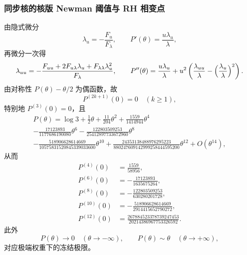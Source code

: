 \subsubsection{同步核的核版 Newman 阈值与 RH 相变点}\label{app:sync-kernel-weighted-newman-threshold}


由隐式微分
\[
\lambda_u=-\frac{F_u}{F_\lambda},\qquad
P'(\theta)=\frac{u\lambda_u}{\lambda},
\]
再微分一次得
\[
\lambda_{uu}=-\frac{F_{uu}+2F_{u\lambda}\lambda_u+F_{\lambda\lambda}\lambda_u^2}{F_\lambda},
\qquad
P''(\theta)=\frac{u\lambda_u}{\lambda}+u^2\left(\frac{\lambda_{uu}}{\lambda}-\Bigl(\frac{\lambda_u}{\lambda}\Bigr)^2\right).
\]
由对称性 $P(\theta)-\theta/2$ 为偶函数，故
\[
P^{(2k+1)}(0)=0\quad(k\ge 1),
\]
特别地 $P^{(3)}(0)=0$，且
\[
\begin{aligned}
P(\theta)=\log 3+\frac12\theta+\frac{11}{204}\theta^2+\frac{1559}{1414944}\theta^4\\
-\frac{17123893}{1177686190080}\theta^6-\frac{122803509253}{25412897733672960}\theta^8\\
-\frac{518906628614669}{10575831520845339033600}\theta^{10}
+\frac{24353138488976295223}{880247609142999258444595200}\theta^{12}
+O(\theta^{14}),
\end{aligned}
\]
从而
\[
\begin{aligned}
P^{(4)}(0)&=\frac{1559}{58956},\\
P^{(6)}(0)&=-\frac{17123893}{1635675264},\\
P^{(8)}(0)&=-\frac{122803509253}{630280201728},\\
P^{(10)}(0)&=-\frac{518906628614669}{2914415652790272},\\
P^{(12)}(0)&=\frac{267884523378739247453}{20214386967753326592}.
\end{aligned}
\]
此外
\[
P(\theta)\to 0\quad(\theta\to-\infty),\qquad
P(\theta)\sim \theta\quad(\theta\to+\infty),
\]
对应极端权重下的冻结极限。



